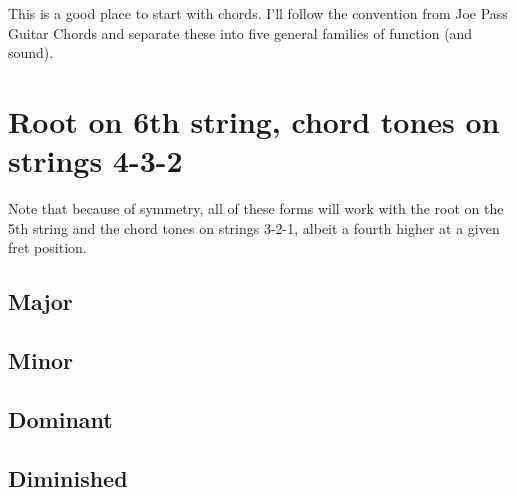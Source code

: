 
This is a good place to start with chords.  I'll follow the convention from Joe Pass Guitar Chords and separate these into five general families of function (and sound).

\section{Root on 6th string, chord tones on strings 4-3-2}

Note that because of symmetry, all of these forms will work with the root on the 5th string and the chord tones on strings 3-2-1, albeit a fourth higher at a given fret position.

\subsection{Major}

\mediumchords
\def\numfrets{6}


\subsection{Minor}



\subsection{Dominant}
\chords{

}

\subsection{Diminished}

